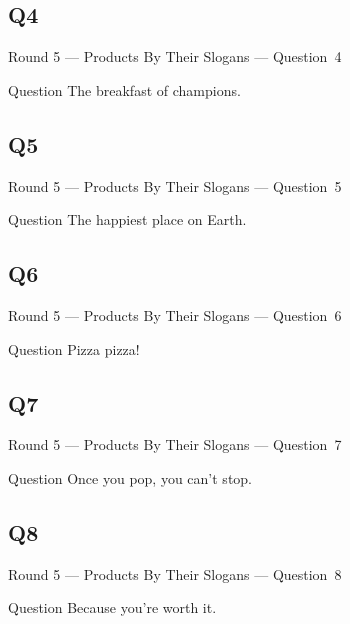 \documentclass[11pt]{beamer}
\begin{document}
\subsection*{Q4}
\begin{frame}[t]{Round 5 --- Products By Their Slogans --- \mbox{Question 4}}
\begin{block}{Question}
The breakfast of champions.
\end{block}
\end{frame}
\subsection*{Q5}
\begin{frame}[t]{Round 5 --- Products By Their Slogans --- \mbox{Question 5}}
\begin{block}{Question}
The happiest place on Earth.
\end{block}
\end{frame}
\subsection*{Q6}
\begin{frame}[t]{Round 5 --- Products By Their Slogans --- \mbox{Question 6}}
\begin{block}{Question}
Pizza pizza!
\end{block}
\end{frame}
\subsection*{Q7}
\begin{frame}[t]{Round 5 --- Products By Their Slogans --- \mbox{Question 7}}
\begin{block}{Question}
Once you pop, you can't stop.
\end{block}
\end{frame}
\subsection*{Q8}
\begin{frame}[t]{Round 5 --- Products By Their Slogans --- \mbox{Question 8}}
\begin{block}{Question}
Because you're worth it.
\end{block}
\end{frame}
\end{document}
